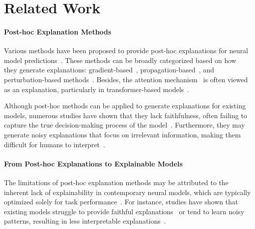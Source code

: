 \section{Related Work}
\paragraph{Post-hoc Explanation Methods} 
Various methods have been proposed to provide post-hoc explanations for neural model predictions~\citep{atanasova-etal-2020-diagnostic}. 
These methods can be broadly categorized based on how they generate explanations: gradient-based~\citep{DBLP:journals/corr/SimonyanVZ13, DBLP:journals/corr/KindermansSMD16, Sundararajan-2017-IntegratedGrad}, propagation-based~\citep{bach2015pixel, shrikumar2017learning, DBLP:journals/corr/SpringenbergDBR14}, and perturbation-based methods~\citep{DBLP:journals/corr/LiMJ16a, Ribeiro-2016-LIME, Lundberg-2017-SHAP}. 
Besides, the attention mechanism~\citep{DBLP:journals/corr/BahdanauCB14} is often viewed as an explanation, particularly in transformer-based models~\citep{DBLP:conf/nips/VaswaniSPUJGKP17}. 

Although post-hoc methods can be applied to generate explanations for existing models, numerous studies have shown that they lack faithfulness, often failing to capture the true decision-making process of the model~\citep{Kindermans-2019-Reliability, jain-wallace-2019-attention, Slack-2020-FoolingLimeSHAP, pruthi-etal-2020-learning}. 
Furthermore, they may generate noisy explanations that focus on irrelevant information, making them difficult for humans to interpret~\citep{Smilkov-2017-SmoothGrad, NEURIPS2021_e0cd3f16}. 

\paragraph{From Post-hoc Explanations to Explainable Models}

The limitations of post-hoc explanation methods may be attributed to the inherent lack of explainability in contemporary neural models, which are typically optimized solely for task performance~\citep{Kindermans-2018-PatternNet, rudin2019stop, atanasova2022diagnostics}. 
For instance, studies have shown that existing models struggle to provide faithful explanations~\citep{NEURIPS2018_3e9f0fc9} or tend to learn noisy patterns, resulting in less interpretable explanations~\citep{NEURIPS2021_e0cd3f16}. 

